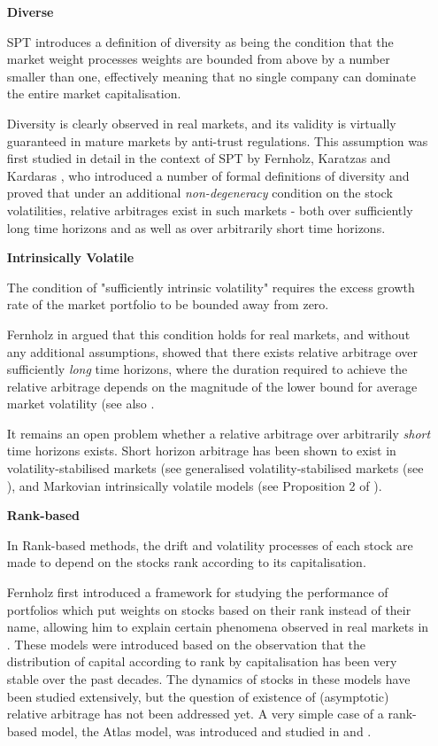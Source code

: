 \documentclass[british]{amsart} \usepackage{lmodern}
\numberwithin{equation}{section} \numberwithin{figure}{section}
\theoremstyle{plain} \newtheorem{thm}{\protect\theoremname}[section]
\theoremstyle{definition} \newtheorem{defn}[thm]{\protect\definitionname}
\theoremstyle{plain} \newtheorem{assumption}[thm]{\protect\assumptionname}
\theoremstyle{plain} \newtheorem{lem}[thm]{\protect\lemmaname}
\theoremstyle{plain} \newtheorem{prop}[thm]{\protect\propositionname}
\theoremstyle{remark} \newtheorem{rem}[thm]{\protect\remarkname}
\theoremstyle{plain} \newtheorem{cor}[thm]{\protect\corollaryname}
\begin{document}
\begin{enumerate}

\item[\textbf{Diverse}] 

SPT introduces a definition of diversity as being the condition that the market
weight processes weights are bounded from above by a number smaller than one,
effectively meaning that no single company can dominate the entire market
capitalisation.

Diversity is clearly observed in real markets, and its validity is virtually
guaranteed in mature markets by anti-trust regulations. This assumption was
first studied in detail in the context of SPT by Fernholz, Karatzas and Kardaras
\cite{fernholz2005}, who introduced a number of formal definitions of diversity
and proved that under an additional \textit{non-degeneracy} condition on the
stock volatilities, relative arbitrages exist in such markets - both over
sufficiently long time horizons and as well as over arbitrarily short time
horizons.

\item[\textbf{Intrinsically Volatile}]

The condition of "sufficiently intrinsic volatility" requires the excess growth
rate of the market portfolio to be bounded away from zero.

Fernholz in \cite{fernholz2002} argued that this condition holds for real
markets, and without any additional assumptions, showed that there exists
relative arbitrage over sufficiently \textit{long} time horizons, where the
duration required to achieve the relative arbitrage depends on the magnitude of
the lower bound for average market volatility (see also
\cite{fernholz2005relative}.

It remains an open problem whether a relative arbitrage over arbitrarily
\textit{short} time horizons exists. Short horizon arbitrage  has been shown to
exist in volatility-stabilised markets (see \cite{banner2008short} generalised
volatility-stabilised markets (see \cite{pickova2014generalized}), and Markovian
intrinsically volatile models (see Proposition 2 of \cite{fernholz2009}).

\item[\textbf{Rank-based}] 

In Rank-based methods, the drift and volatility processes of each stock are made
to depend on the stocks rank according to its capitalisation.

Fernholz first introduced a framework for studying the performance of portfolios
which put weights on stocks based on their rank instead of their name, allowing
him to explain certain phenomena observed in real markets in
\cite{fernholz2002}. These models were introduced based on the observation that
the distribution of capital according to rank by capitalisation has been very
stable over the past decades. The dynamics of stocks in these models have been
studied extensively, but the question of existence of (asymptotic) relative
arbitrage has not been addressed yet. A very simple case of a rank-based model,
the Atlas model, was introduced and studied in \cite{banner2005atlas} and
\cite{ichiba2011hybrid}.

\end{enumerate}
\end{document}
